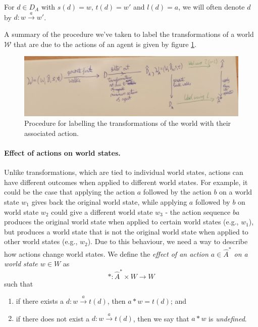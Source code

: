 For $d \in D_{A}$ with $s(d) = w$, $t(d) = w'$ and $l(d) = a$, we will often denote $d$ by $d: w \xrightarrow{a} w'$.

A summary of the procedure we've taken to label the transformations of a world $\mathscr{W}$ that are due to the actions of an agent is given by figure \ref{fig:action_labelling_procedure}.

\begin{figure}
	\centering
	\includegraphics[width=\linewidth]{2MathematicalFramework/Images/action_labelling_procedure.jpeg}
	\caption{Procedure for labelling the transformations of the world with their associated action.}
	\label{fig:action_labelling_procedure}
\end{figure}


\paragraph{Effect of actions on world states.}
Unlike transformations, which are tied to individual world states, actions can have different outcomes when applied to different world states.
For example, it could be the case that applying the action $a$ followed by the action $b$ on a world state $w_{1}$ gives back the original world state, while applying $a$ followed by $b$ on world state $w_{2}$ could give a different world state $w_{3}$ - the action sequence $ba$ produces the original world state when applied to certain world states (e.g., $w_{1}$), but produces a world state that is not the original world state when applied to other world states (e.g., $w_{2}$).
Due to this behaviour, we need a way to describe how actions change world states.
We define the \emph{effect of an action $a \in \hat{A}^{\ast}$ on a world state $w \in W$} as
\begin{equation}
	\ast: \hat{A}^{\ast} \times W \to W
\end{equation}
such that
\begin{enumerate}
	\item if there exists a $d: w \xrightarrow{a} t(d)$, then $a \ast w = t(d)$; and
	\item if there does not exist a $d: w \xrightarrow{a} t(d)$, then we say that $a \ast w$ is \emph{undefined}.
\end{enumerate}


